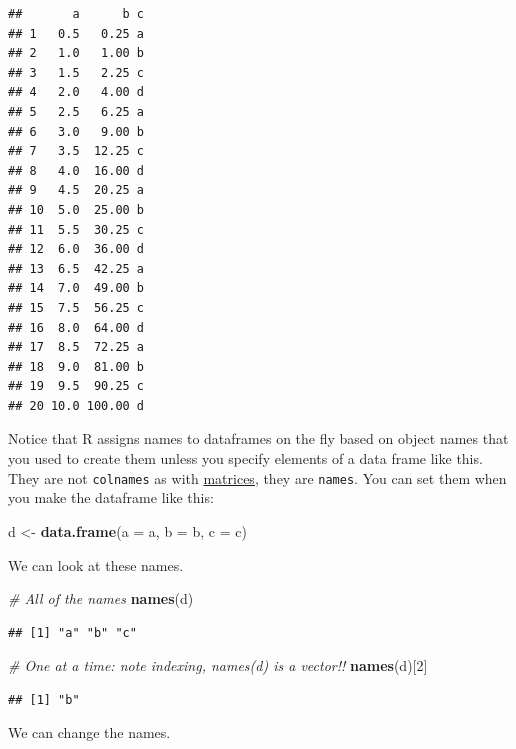 \documentclass[
]{book}
\newenvironment{Shaded}{\begin{snugshade}}{\end{snugshade}}
\newcommand{\CommentTok}[1]{\textcolor[rgb]{0.56,0.35,0.01}{\textit{#1}}}
\newcommand{\DataTypeTok}[1]{\textcolor[rgb]{0.13,0.29,0.53}{#1}}
\newcommand{\DecValTok}[1]{\textcolor[rgb]{0.00,0.00,0.81}{#1}}
\newcommand{\KeywordTok}[1]{\textcolor[rgb]{0.13,0.29,0.53}{\textbf{#1}}}
\newcommand{\NormalTok}[1]{#1}
\newcommand{\StringTok}[1]{\textcolor[rgb]{0.31,0.60,0.02}{#1}}
\begin{document}
\begin{verbatim}
##       a      b c
## 1   0.5   0.25 a
## 2   1.0   1.00 b
## 3   1.5   2.25 c
## 4   2.0   4.00 d
## 5   2.5   6.25 a
## 6   3.0   9.00 b
## 7   3.5  12.25 c
## 8   4.0  16.00 d
## 9   4.5  20.25 a
## 10  5.0  25.00 b
## 11  5.5  30.25 c
## 12  6.0  36.00 d
## 13  6.5  42.25 a
## 14  7.0  49.00 b
## 15  7.5  56.25 c
## 16  8.0  64.00 d
## 17  8.5  72.25 a
## 18  9.0  81.00 b
## 19  9.5  90.25 c
## 20 10.0 100.00 d
\end{verbatim}

Notice that R assigns names to dataframes on the fly based on object names that you used to create them unless you specify elements of a data frame like this. They are not \texttt{colnames} as with \protect\hyperlink{matrices}{matrices}, they are \texttt{names}. You can set them when you make the dataframe like this:

\begin{Shaded}
\begin{Highlighting}[]
\NormalTok{d <-}\StringTok{ }\KeywordTok{data.frame}\NormalTok{(}\DataTypeTok{a =}\NormalTok{ a, }\DataTypeTok{b =}\NormalTok{ b, }\DataTypeTok{c =}\NormalTok{ c)}
\end{Highlighting}
\end{Shaded}

We can look at these names.

\begin{Shaded}
\begin{Highlighting}[]
\CommentTok{# All of the names}
\KeywordTok{names}\NormalTok{(d)}
\end{Highlighting}
\end{Shaded}

\begin{verbatim}
## [1] "a" "b" "c"
\end{verbatim}

\begin{Shaded}
\begin{Highlighting}[]
\CommentTok{# One at a time: note indexing, names(d) is a vector!!}
\KeywordTok{names}\NormalTok{(d)[}\DecValTok{2}\NormalTok{]}
\end{Highlighting}
\end{Shaded}

\begin{verbatim}
## [1] "b"
\end{verbatim}

We can change the names.
\end{document}
